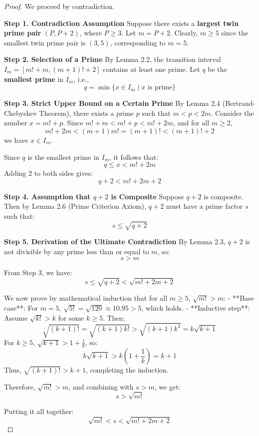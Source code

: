\documentclass[12pt,letterpaper,reqno]{amsart}
\theoremstyle{plain}
\theoremstyle{definition}
\theoremstyle{remark}
\begin{document}
	\begin{proof}
		We proceed by contradiction.
		
		\medskip
		\noindent\textbf{Step 1. Contradiction Assumption}
		Suppose there exists a \textbf{largest twin prime pair} $(P, P+2)$, where $P \ge 3$. Let $m = P+2$. Clearly, $m \ge 5$ since the smallest twin prime pair is $(3,5)$, corresponding to $m=5$.
		
		\medskip
		\noindent\textbf{Step 2. Selection of a Prime}
		By Lemma 2.2, the transition interval $I_m = [m!+m, (m+1)!+2]$ contains at least one prime. Let $q$ be the \textbf{smallest prime} in $I_m$, i.e.,
		\[
		q = \min \{ x \in I_m \mid x \text{ is prime} \}
		\]
		
		\medskip
		\noindent\textbf{Step 3. Strict Upper Bound on a Certain Prime}
		By Lemma 2.4 (Bertrand-Chebyshev Theorem), there exists a prime $p$ such that $m < p < 2m$. Consider the number $x = m!+p$. Since $m!+m < m!+p < m!+2m$, and for all $m \ge 2$,
		\[
		m!+2m < (m+1)m! = (m+1)! < (m+1)!+2
		\]
		we have $x \in I_m$.
		
		Since $q$ is the smallest prime in $I_m$, it follows that:
		\[
		q \le x < m!+2m
		\]
		Adding 2 to both sides gives:
		\[
		q+2 < m!+2m+2
		\]
		
		\medskip
		\noindent\textbf{Step 4. Assumption that $q+2$ is Composite}
		Suppose $q+2$ is composite. Then by Lemma 2.6 (Prime Criterion Axiom), $q+2$ must have a prime factor $s$ such that:
		\[
		s \le \sqrt{q+2}
		\]
		
		\medskip
		\noindent\textbf{Step 5. Derivation of the Ultimate Contradiction}
		By Lemma 2.3, $q+2$ is not divisible by any prime less than or equal to $m$, so:
		\[
		s > m
		\]
		
		From Step 3, we have:
		\[
		s \le \sqrt{q+2} < \sqrt{m!+2m+2}
		\]
		
		We now prove by mathematical induction that for all $m \ge 5$, $\sqrt{m!} > m$:
		- **Base case**: For $m=5$, $\sqrt{5!} = \sqrt{120} \approx 10.95 > 5$, which holds.
		- **Inductive step**: Assume $\sqrt{k!} > k$ for some $k \ge 5$. Then:
		\[
		\sqrt{(k+1)!} = \sqrt{(k+1)k!} > \sqrt{(k+1)k^2} = k\sqrt{k+1}
		\]
		For $k \ge 5$, $\sqrt{k+1} > 1 + \frac{1}{k}$, so:
		\[
		k\sqrt{k+1} > k\left(1 + \frac{1}{k}\right) = k+1
		\]
		Thus, $\sqrt{(k+1)!} > k+1$, completing the induction.
		
		Therefore, $\sqrt{m!} > m$, and combining with $s > m$, we get:
		\[
		s > \sqrt{m!}
		\]
		
		Putting it all together:
		\[
		\sqrt{m!} < s < \sqrt{m!+2m+2}
		\]
		

\end{proof}
\end{document}
